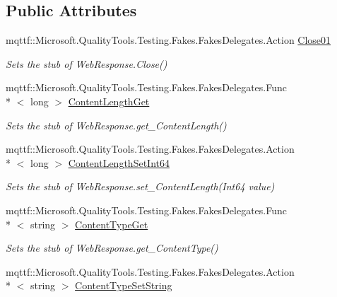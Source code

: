 \subsection*{Public Attributes}
\begin{DoxyCompactItemize}
\item 
mqttf\-::\-Microsoft.\-Quality\-Tools.\-Testing.\-Fakes.\-Fakes\-Delegates.\-Action \hyperlink{class_system_1_1_net_1_1_fakes_1_1_stub_web_response_a09d89116ea87973cf1033fbdf1254168}{Close01}
\begin{DoxyCompactList}\small\item\em Sets the stub of Web\-Response.\-Close()\end{DoxyCompactList}\item 
mqttf\-::\-Microsoft.\-Quality\-Tools.\-Testing.\-Fakes.\-Fakes\-Delegates.\-Func\\*
$<$ long $>$ \hyperlink{class_system_1_1_net_1_1_fakes_1_1_stub_web_response_aacfbc020c292c4fd50a402b7a3588fb4}{Content\-Length\-Get}
\begin{DoxyCompactList}\small\item\em Sets the stub of Web\-Response.\-get\-\_\-\-Content\-Length()\end{DoxyCompactList}\item 
mqttf\-::\-Microsoft.\-Quality\-Tools.\-Testing.\-Fakes.\-Fakes\-Delegates.\-Action\\*
$<$ long $>$ \hyperlink{class_system_1_1_net_1_1_fakes_1_1_stub_web_response_a9485e4bf8db1025d80c59a70841e08aa}{Content\-Length\-Set\-Int64}
\begin{DoxyCompactList}\small\item\em Sets the stub of Web\-Response.\-set\-\_\-\-Content\-Length(\-Int64 value)\end{DoxyCompactList}\item 
mqttf\-::\-Microsoft.\-Quality\-Tools.\-Testing.\-Fakes.\-Fakes\-Delegates.\-Func\\*
$<$ string $>$ \hyperlink{class_system_1_1_net_1_1_fakes_1_1_stub_web_response_aac87bc4cabb22bbbc1191952e6938fa2}{Content\-Type\-Get}
\begin{DoxyCompactList}\small\item\em Sets the stub of Web\-Response.\-get\-\_\-\-Content\-Type()\end{DoxyCompactList}\item 
mqttf\-::\-Microsoft.\-Quality\-Tools.\-Testing.\-Fakes.\-Fakes\-Delegates.\-Action\\*
$<$ string $>$ \hyperlink{class_system_1_1_net_1_1_fakes_1_1_stub_web_response_a30bd7bb5a62f05a559cf0895e25adf75}{Content\-Type\-Set\-String}

\end{DoxyCompactItemize}
